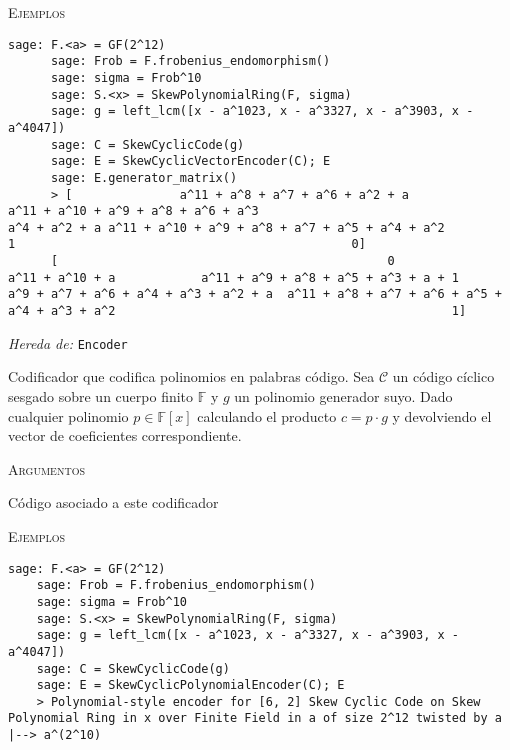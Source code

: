 \begin{description}[leftmargin=1em, font=\normalfont\ttfamily, style=nextline]
\begin{description}[font=\ttfamily, style=nextline]
    \textsc{Ejemplos}
    \begin{lstlisting}[gobble=6]
      sage: F.<a> = GF(2^12)
      sage: Frob = F.frobenius_endomorphism()
      sage: sigma = Frob^10
      sage: S.<x> = SkewPolynomialRing(F, sigma)
      sage: g = left_lcm([x - a^1023, x - a^3327, x - a^3903, x - a^4047])
      sage: C = SkewCyclicCode(g)
      sage: E = SkewCyclicVectorEncoder(C); E
      sage: E.generator_matrix()
      > [               a^11 + a^8 + a^7 + a^6 + a^2 + a             a^11 + a^10 + a^9 + a^8 + a^6 + a^3                                   a^4 + a^2 + a a^11 + a^10 + a^9 + a^8 + a^7 + a^5 + a^4 + a^2                                               1                                               0]
      [                                              0                                 a^11 + a^10 + a            a^11 + a^9 + a^8 + a^5 + a^3 + a + 1           a^9 + a^7 + a^6 + a^4 + a^3 + a^2 + a  a^11 + a^8 + a^7 + a^6 + a^5 + a^4 + a^3 + a^2                                               1]
    \end{lstlisting}
  \end{description}

  \item[class SkewCyclicPolynomialEncoder(self, code)]

  \emph{Hereda de:} \texttt{Encoder}

  Codificador que codifica polinomios en palabras código.
  Sea \(\mathcal C\) un código cíclico sesgado sobre un cuerpo finito \(\mathbb F\) y \(g\) un polinomio generador suyo.
  Dado cualquier polinomio \(p \in \mathbb F[x]\) calculando el producto \(c = p \cdot g\) y devolviendo el vector de coeficientes correspondiente.

  \textsc{Argumentos}
  \begin{description}[font=\normalfont\ttfamily]
    \item[code] Código asociado a este codificador
  \end{description}

  \textsc{Ejemplos}
  \begin{lstlisting}[gobble=4]
    sage: F.<a> = GF(2^12)
    sage: Frob = F.frobenius_endomorphism()
    sage: sigma = Frob^10
    sage: S.<x> = SkewPolynomialRing(F, sigma)
    sage: g = left_lcm([x - a^1023, x - a^3327, x - a^3903, x - a^4047])
    sage: C = SkewCyclicCode(g)
    sage: E = SkewCyclicPolynomialEncoder(C); E
    > Polynomial-style encoder for [6, 2] Skew Cyclic Code on Skew Polynomial Ring in x over Finite Field in a of size 2^12 twisted by a |--> a^(2^10)
  \end{lstlisting}


\end{description}
